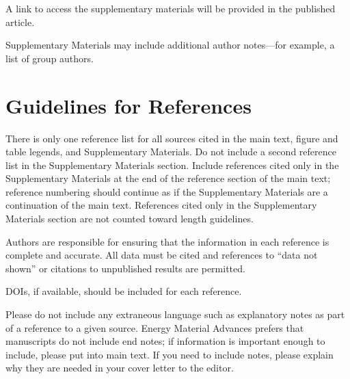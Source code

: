 \documentclass{article}
\begin{document}
A link to access the supplementary materials will be provided in the published article.

Supplementary Materials may include additional author notes—for example, a list of group authors.

\section*{Guidelines for References}

There is only one reference list for all sources cited in the main text, figure and table legends, and Supplementary Materials. Do not include a second reference list in the Supplementary Materials section. Include references cited only in the Supplementary Materials at the end of the reference section of the main text; reference numbering should continue as if the Supplementary Materials are a continuation of the main text. References cited only in the Supplementary Materials section are not counted toward length guidelines.

Authors are responsible for ensuring that the information in each reference is complete and accurate. All data must be cited and references to “data not shown” or citations to unpublished results are permitted.

 DOIs, if available, should be included for each reference.

Please do not include any extraneous language such as explanatory notes as part of a reference to a given source. Energy Material Advances prefers that manuscripts do not include end notes; if information is important enough to include, please put into main text.  If you need to include notes, please explain why they are needed in your cover letter to the editor.

\printbibliography
\end{document}
